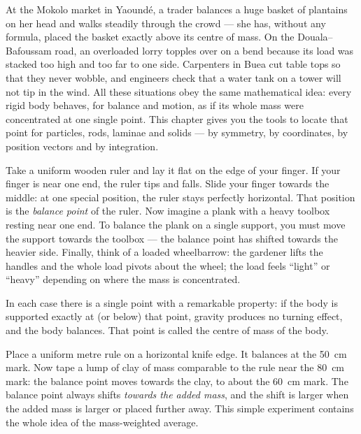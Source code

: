 \documentclass[11pt]{article}
\newcommand{\cle}[1]{{\popxbold\color{popdark}#1}}
\newcounter{popsec}
\newcounter{popsub}
\newcommand{\courssub}[1]{%
  \stepcounter{popsub}%
  \par\vspace{9pt}\noindent{\popxbold\fontsize{11.5}{13}\selectfont\color{popink}{\color{poporange}\thepopsec.\thepopsub}\hspace{6pt}#1}\par\nopagebreak\vspace{4pt}
}
\begin{document}
At the Mokolo market in Yaoundé, a trader balances a huge basket of plantains on her head and walks steadily through the crowd — she has, without any formula, placed the basket exactly above its \cle{centre of mass}. On the Douala–Bafoussam road, an overloaded lorry topples over on a bend because its load was stacked too high and too far to one side. Carpenters in Buea cut table tops so that they never wobble, and engineers check that a water tank on a tower will not tip in the wind. All these situations obey the same mathematical idea: every rigid body behaves, for balance and motion, as if its whole mass were concentrated at one single point. This chapter gives you the tools to locate that point for particles, rods, laminae and solids — by symmetry, by coordinates, by position vectors and by integration.

\courssub{The Balance Point: an Intuitive Introduction}

Take a uniform wooden ruler and lay it flat on the edge of your finger. If your finger is near one end, the ruler tips and falls. Slide your finger towards the middle: at one special position, the ruler stays perfectly horizontal. That position is the \emph{balance point} of the ruler. Now imagine a plank with a heavy toolbox resting near one end. To balance the plank on a single support, you must move the support towards the toolbox — the balance point has shifted towards the heavier side. Finally, think of a loaded wheelbarrow: the gardener lifts the handles and the whole load pivots about the wheel; the load feels ``light'' or ``heavy'' depending on where the mass is concentrated.

In each case there is a single point with a remarkable property: if the body is supported exactly at (or below) that point, gravity produces no turning effect, and the body balances. That point is called the \cle{centre of mass} of the body.

\begin{experience}
Place a uniform metre rule on a horizontal knife edge. It balances at the \SI{50}{cm} mark. Now tape a lump of clay of mass comparable to the rule near the \SI{80}{cm} mark: the balance point moves towards the clay, to about the \SI{60}{cm} mark. The balance point always shifts \emph{towards the added mass}, and the shift is larger when the added mass is larger or placed further away. This simple experiment contains the whole idea of the mass-weighted average.
\end{experience}
\end{document}
